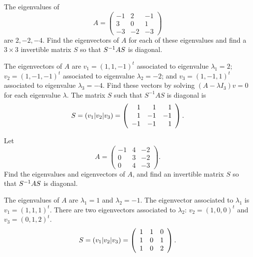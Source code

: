 \documentclass{ximera}
\begin{document}
\begin{exercise} \label{c10.3.2}
The eigenvalues of 
\[
A=\left(\begin{array}{rrr} -1 & 2 & -1\\ 3& 0 & 1 \\ -3 & -2 & -3 \end{array}
\right)
\]
are $2,-2,-4$.  Find the eigenvectors of $A$ for each of these eigenvalues and 
find a $3\times 3$ invertible matrix $S$ so that $S^{-1} AS$ is diagonal.

\begin{solution}

The eigenvectors of $A$ are $v_1 = (1,1,-1)^t$ associated to eigenvalue
$\lambda_1 = 2$; $v_2 = (1,-1,-1)^t$ associated to eigenvalue
$\lambda_2 = -2$; and $v_3 = (1,-1,1)^t$ associated to eigenvalue
$\lambda_3 = -4$.  Find these vectors by solving $(A - \lambda I_3)v = 0$
for each eigenvalue $\lambda$.  The matrix $S$ such that $S^{-1}AS$ is
diagonal is
\[
S = (v_1|v_2|v_3) = \left(\begin{array}{rrr} 1 & 1 & 1 \\ 1 & -1 & -1 \\ -1 & -1 & 1\end{array}\right).
\]

\end{solution}
\end{exercise} 

\begin{exercise} \label{c10.3.3}
Let
\[
A=\left(\begin{array}{rrr} -1 & 4 & -2 \\ 0 & 3 & -2 \\ 0 & 4 & -3 \end{array}
\right).
\]
Find the eigenvalues and eigenvectors of $A$, and find an invertible  
matrix $S$ so that $S^{-1} AS$ is diagonal.

\begin{solution}

The eigenvalues of $A$ are $\lambda_1 = 1$ and $\lambda_2 = -1$.  The
eigenvector associated to $\lambda_1$ is $v_1 = (1,1,1)^t$.  There are
two eigenvectors associated to $\lambda_2$: $v_2 = (1,0,0)^t$ and
$v_3 = (0,1,2)^t$.
\[
S = (v_1|v_2|v_3) = \left(\begin{array}{rrr} 1 & 1 & 0 \\ 1 & 0 & 1 \\ 1 & 0 & 2\end{array}\right).
\]

\end{solution}
\end{exercise}
\end{document}
